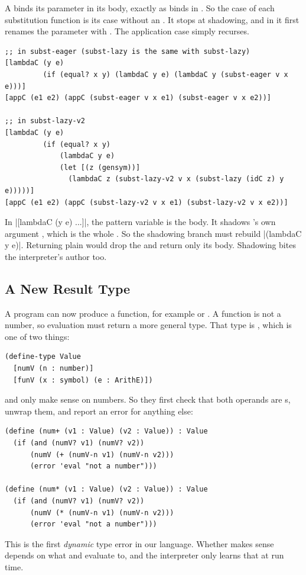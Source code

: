 A  binds its parameter in its body, exactly as  binds  in . So the  case of each substitution function is its  case without an . It stops at shadowing, and in  it first renames the parameter with . The application case simply recurses.
\begin{lstlisting}
;; in subst-eager (subst-lazy is the same with subst-lazy)
[lambdaC (y e)
         (if (equal? x y) (lambdaC y e) (lambdaC y (subst-eager v x e)))]
[appC (e1 e2) (appC (subst-eager v x e1) (subst-eager v x e2))]

;; in subst-lazy-v2
[lambdaC (y e)
         (if (equal? x y)
             (lambdaC y e)
             (let [(z (gensym))]
               (lambdaC z (subst-lazy-v2 v x (subst-lazy (idC z) y e)))))]
[appC (e1 e2) (appC (subst-lazy-v2 v x e1) (subst-lazy-v2 v x e2))]
\end{lstlisting}

\begin{pitfall}
In \rkt|[lambdaC (y e) ...]|, the pattern variable  is the body. It shadows 's own argument , which is the whole . So the shadowing branch must rebuild \rkt|(lambdaC y e)|. Returning plain  would drop the  and return only its body. Shadowing bites the interpreter's author too.
\end{pitfall}

\subsection{A New Result Type}

A program can now produce a function, for example  or . A function is not a number, so evaluation must return a more general type. That type is , which is one of two things:
\begin{lstlisting}
(define-type Value
  [numV (n : number)]
  [funV (x : symbol) (e : ArithE)])
\end{lstlisting}
\code{+} and \code{*} only make sense on numbers. So they first check that both operands are s, unwrap them, and report an error for anything else:
\begin{lstlisting}
(define (num+ (v1 : Value) (v2 : Value)) : Value
  (if (and (numV? v1) (numV? v2))
      (numV (+ (numV-n v1) (numV-n v2)))
      (error 'eval "not a number")))

(define (num* (v1 : Value) (v2 : Value)) : Value
  (if (and (numV? v1) (numV? v2))
      (numV (* (numV-n v1) (numV-n v2)))
      (error 'eval "not a number")))
\end{lstlisting}
This is the first \emph{dynamic} type error in our language. Whether  makes sense depends on what  and  evaluate to, and the interpreter only learns that at run time.

